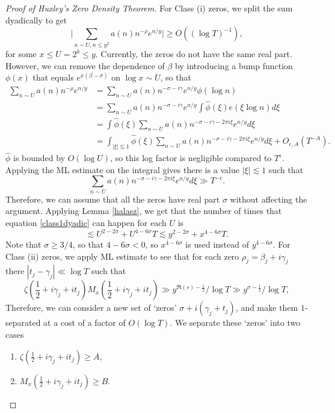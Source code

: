\begin{proof}[Proof of Huxley's Zero Density Theorem]
    For Class (i) zeros, we split the sum dyadically to get \begin{equation}
    \label{class1dyadic}
    \bigg| \sum_{n\sim U, n\leq y^2} a(n)  n^{-\rho}e^{n/y}\bigg| \geq O((\log T)^{-1}),
    \end{equation}
    for some $x\leq U = 2^k\leq y$. Currently, the zeros do not have the same real part. However, we can remove the dependence of $\beta$ by introducing a bump function $\phi(x)$ that equals $e^{x(\beta-\sigma)}$ on $\log x\sim U$, so that\begin{align*}
        \sum_{n\sim U}  a(n)  n^{-\rho}e^{n/y} &= \sum_{n\sim U}  a(n)  n^{-\sigma-i\gamma}e^{n/y} \phi(\log n)\\
        &=\sum_{n\sim U}  a(n)  n^{-\sigma-i\gamma}e^{n/y} \int \hat\phi(\xi) e(\xi\log n ) d\xi \\
        &=\int \hat\phi(\xi) \sum_{n\sim U}  a(n)  n^{-\sigma-i\gamma-2\pi i \xi}e^{n/y} d\xi \\
        &= \int_{|\xi|\lesssim 1} \hat\phi(\xi) \sum_{n\sim U}  a(n)  n^{-\sigma-i\gamma-2\pi i \xi}e^{n/y} d\xi + O_{\epsilon,A}(T^{-A}).
    \end{align*} 
    $\hat\phi$ is bounded by $O(\log U)$, so this log factor is negligible compared to $T^\epsilon$. Applying the ML estimate on the integral gives there is a value $|\xi|\lesssim 1$ such that \[
        \sum_{n\sim U}  a(n)  n^{-\sigma-i\gamma-2\pi i \xi}e^{n/y} d\xi \gg T^{-\epsilon}.
    \] 
    Therefore, we can assume that all the zeros have real part $\sigma$ without affecting the argument. 
    Applying Lemma \ref{halasz}, we get that the number of times that equation \ref{class1dyadic} can happen for each $U$ is \[
    \lesssim U^{2-2\sigma} + U^{4-6\sigma}T\lesssim y^{2-2\sigma}+x^{4-6\sigma}T.
    \]
    Note that $\sigma\geq 3/4$, so that $4-6\sigma<0$, so $x^{4-6\sigma}$ is used instead of $y^{4-6\sigma}$.
    For Class (ii) zeros, we apply ML estimate to see that for each zero $\rho_j=\beta_j+i\gamma_j$ there $|t_j-\gamma_j|\ll \log T$ such that \[
        \zeta(\frac{1}{2}+i\gamma_j+it_j)M_x(\frac{1}{2}+i\gamma_j+it_j)\gg  y^{\Re(s)-\frac{1}{2}}/\log T \gg y^{\sigma-\frac{1}{2}}/\log T,
    \]
    Therefore, we can consider a new set of `zeros' $\sigma + i(\gamma_j+t_j)$, and make them $1$-separated at a cost of a factor of $O(\log T)$.
    We separate these `zeros' into two cases \begin{enumerate}[label=(\alph*)]
        \item $\zeta(\frac{1}{2}+i\gamma_j+it_j)\geq A$,
        \item $M_x(\frac{1}{2}+i\gamma_j+it_j)\geq B$.

\end{enumerate}
\end{proof}
